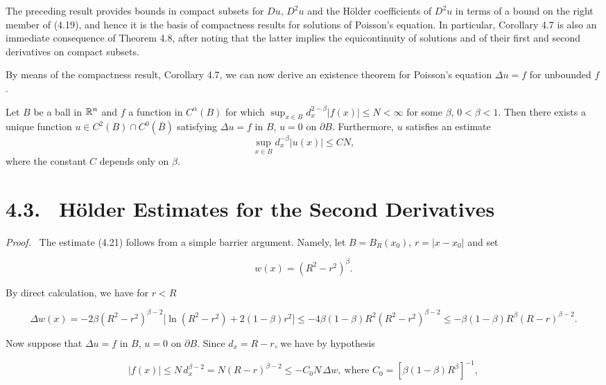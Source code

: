 The preceding result provides bounds in compact subsets for $Du$, $D^2u$ and the Hölder coefficients of $D^2u$ in terms of a bound on the right member of (4.19), and hence it is the basis of compactness results for solutions of Poisson's equation. In particular, Corollary 4.7 is also an immediate consequence of Theorem 4.8, after noting that the latter implies the equicontinuity of solutions and of their first and second derivatives on compact subsets.

By means of the compactness result, Corollary 4.7, we can now derive an existence theorem for Poisson's equation $\Delta u=f$ for unbounded $f$.

\begin{theorem}\label{gt:thm-poisson-ball-unbounded}
Let $B$ be a ball in $\mathbb{R}^n$ and $f$ a function in $C^\alpha(B)$ for which $\sup_{x\in B} d_x^{2-\beta}|f(x)| \le N < \infty$ for some $\beta$, $0<\beta<1$. Then there exists a unique function $u \in C^2(B)\cap C^0(\bar{B})$ satisfying $\Delta u=f$ in $B$, $u=0$ on $\partial B$. Furthermore, $u$ satisfies an estimate
\begin{equation}
\sup_{x\in B} d_x^{-\beta}|u(x)| \le CN,
\tag{4.21}
\end{equation}
where the constant $C$ depends only on $\beta$.
\end{theorem}

\pagestyle{empty}

\section*{4.3. \ H\"older Estimates for the Second Derivatives}

\textit{Proof.} \ The estimate (4.21) follows from a simple barrier argument. Namely,
let $B=B_R(x_0)$, $r=|x-x_0|$ and set

\[
w(x)=(R^2-r^2)^\beta.
\]

By direct calculation, we have for $r<R$

\[
\Delta w(x)=-2\beta(R^2-r^2)^{\beta-2}\bigl[\ln(R^2-r^2)+2(1-\beta)r^2\bigr]
\le -4\beta(1-\beta)R^2(R^2-r^2)^{\beta-2}\le -\beta(1-\beta)R^\beta(R-r)^{\beta-2}.
\]

Now suppose that $\Delta u=f$ in $B$, $u=0$ on $\partial B$. Since $d_x=R-r$, we have by hypothesis

\[
|f(x)|\le N\, d_x^{\beta-2}=N(R-r)^{\beta-2}
\le -C_0N\,\Delta w,\ \text{where } C_0=[\beta(1-\beta)R^\beta]^{-1},
\]

